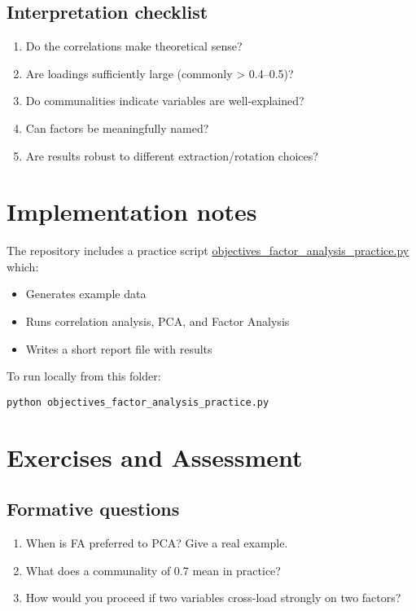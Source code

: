 \documentclass[a4paper]{tufte-book}
\begin{document}
\subsection{Interpretation checklist}
\begin{enumerate}
  \item Do the correlations make theoretical sense?
  \item Are loadings sufficiently large (commonly > 0.4--0.5)?
  \item Do communalities indicate variables are well-explained?
  \item Can factors be meaningfully named?
  \item Are results robust to different extraction/rotation choices?
\end{enumerate}

\section{Implementation notes}
The repository includes a practice script \url{objectives_factor_analysis_practice.py} which:
\begin{itemize}
  \item Generates example data
  \item Runs correlation analysis, PCA, and Factor Analysis
  \item Writes a short report file with results
\end{itemize}

To run locally from this folder:
\begin{verbatim}
python objectives_factor_analysis_practice.py
\end{verbatim}

\section{Exercises and Assessment}
\subsection{Formative questions}
\begin{enumerate}
  \item When is FA preferred to PCA? Give a real example.
  \item What does a communality of 0.7 mean in practice?
  \item How would you proceed if two variables cross-load strongly on two factors?
\end{enumerate}
\end{document}
